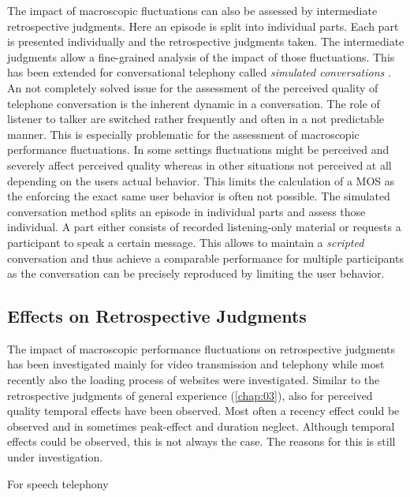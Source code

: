 The impact of macroscopic fluctuations can also be assessed by intermediate retrospective judgments.
Here an episode is split into individual parts.
Each part is presented individually and the retrospective judgments taken.
The intermediate judgments allow a fine-grained analysis of the impact of those fluctuations.
This has been extended for conversational telephony called \emph{simulated conversations} \citep{berger_estimation_2008}.
An not completely solved issue for the assessment of the perceived quality of telephone conversation is the inherent dynamic in a conversation.
The role of listener to talker are switched rather frequently and often in a not predictable manner.
This is especially problematic for the assessment of macroscopic performance fluctuations.
In some settings fluctuations might be perceived and severely affect perceived quality whereas in other situations not perceived at all depending on the users actual behavior.
This limits the calculation of a \ac{MOS} as the enforcing the exact same user behavior is often not possible.
The simulated conversation method splits an episode in individual parts and assess those individual.
A part either consists of recorded listening-only material or requests a participant to speak a certain message.
This allows to maintain a \emph{scripted} conversation and thus achieve a comparable performance for multiple participants as the conversation can be precisely reproduced by limiting the user behavior.

\subsection{Effects on Retrospective Judgments}
The impact of macroscopic performance fluctuations on retrospective judgments has been investigated mainly for video transmission and telephony while most recently also the loading process of websites were investigated.
Similar to the retrospective judgments of general experience (\autoref{chap:03}), also for perceived quality temporal effects have been observed.
Most often a recency effect could be observed and in sometimes peak-effect and duration neglect.
Although temporal effects could be observed, this is not always the case.
The reasons for this is still under investigation.

For speech telephony \citet{gros_instantaneous_2001} 




\cite{berger_estimation_2008}
\cite{lewcio_methods_2008}
\cite{weiss_modeling_2009}

